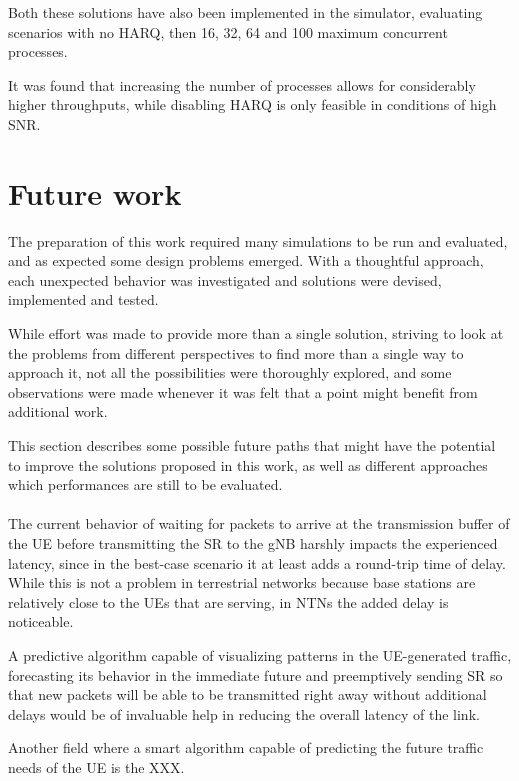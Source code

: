 Both these solutions have also been implemented in the simulator, evaluating scenarios with no \ac{HARQ}, then 16, 32, 64 and 100 maximum concurrent processes. 

It was found that increasing the number of processes allows for considerably higher throughputs, while disabling \ac{HARQ} is only feasible in conditions of high \ac{SNR}.

\section{Future work}

The preparation of this work required many simulations to be run and evaluated, and as expected some design problems emerged. With a thoughtful approach, each unexpected behavior was investigated and solutions were devised, implemented and tested.

While effort was made to provide more than a single solution, striving to look at the problems from different perspectives to find more than a single way to approach it, not all the possibilities were thoroughly explored, and some observations were made whenever it was felt that a point might benefit from additional work.

This section describes some possible future paths that might have the potential to improve the solutions proposed in this work, as well as different approaches which performances are still to be evaluated.

\paragraph{}
The current behavior of waiting for packets to arrive at the transmission buffer of the \ac{UE} before transmitting the \ac{SR} to the \ac{gNB} harshly impacts the experienced latency, since in the best-case scenario it at least adds a round-trip time of delay. While this is not a problem in terrestrial networks because base stations are relatively close to the \ac{UE}s that are serving, in \ac{NTN}s the added delay is noticeable. 

A predictive algorithm capable of visualizing patterns in the \ac{UE}-generated traffic, forecasting its behavior in the immediate future and preemptively sending \ac{SR} so that new packets will be able to be transmitted right away without additional delays would be of invaluable help in reducing the overall latency of the link.

Another field where a smart algorithm capable of predicting the future traffic needs of the \ac{UE} is the XXX.

